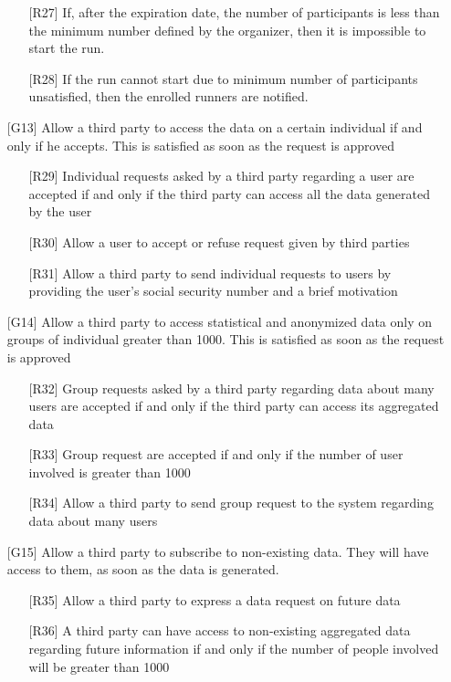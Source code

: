 \begin{itemize}
	\begin{itemize}
	\item[{[R27]}] If, after the expiration date, the number of participants is less than the minimum number defined by the organizer, then it is impossible to start the run.
	\item[{[R28]}] If the run cannot start due to minimum number of participants unsatisfied, then the enrolled runners are notified.
	\end{itemize}
\item[{[G13]}] Allow a third party to access the data on a certain individual if and only if he accepts. This is satisfied as soon as the request is approved
	\begin{itemize}
	\item[{[R29]}] Individual requests asked by a third party regarding a user are accepted if and only if the third party can access all the data generated by the user
	\item[{[R30]}] Allow a user to accept or refuse request given by third parties
	\item[{[R31]}] Allow a third party to send individual requests to users by providing the user's social security number and a brief motivation
	\end{itemize}
\item[{[G14]}] Allow a third party to access statistical and anonymized data only on groups of individual greater than 1000. This is satisfied as soon as the request is approved
	\begin{itemize}
	\item[{[R32]}] Group requests asked by a third party regarding data about many users are accepted if and only if the third party can access its aggregated data
	\item[{[R33]}] Group request are accepted if and only if the number of user involved is greater than 1000
	\item[{[R34]}] Allow a third party to send group request to the system regarding data about many users
	\end{itemize}
\item[{[G15]}] Allow a third party to subscribe to non-existing data. They will have access to them, as soon as the data is generated. 
	\begin{itemize}
	\item[{[R35]}] Allow a third party to express a data request on future data
	\item[{[R36]}] A third party can have access to non-existing aggregated data regarding future information if and only if the number of people involved will be greater than 1000
	\end{itemize}
\end{itemize}

